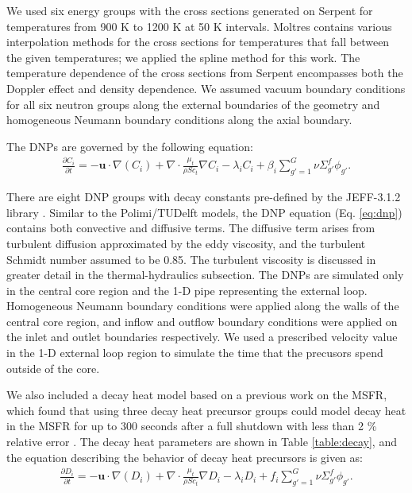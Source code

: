 We used six energy groups with the cross sections generated on Serpent for
temperatures from 900 K to 1200 K at 50 K intervals. Moltres contains various
interpolation methods for the cross sections for temperatures that fall
between the given temperatures; we applied the spline method for this work.
The temperature dependence of the cross sections from Serpent encompasses both
the Doppler effect and density dependence. We assumed vacuum boundary
conditions for all six neutron groups along the external boundaries of the
geometry and homogeneous Neumann boundary conditions along the axial boundary.

The \glspl{DNP} are governed by the following equation:
%
\begin{align}
	\frac{\partial C_i}{\partial t} = - \boldsymbol{u} \cdot \nabla(C_i)
	+ \nabla \cdot \frac{\mu_t}{\rho Sc_t} \nabla C_i	
	- \lambda_i C_i + \beta_i \sum^G_{g'=1} \nu \Sigma^f_{g'}
	\phi_{g'}. \label{eq:dnp}
\end{align}

There are eight \gls{DNP} groups with decay constants pre-defined by the
JEFF-3.1.2 library \cite{oecd/nea_jeff-3.1.2_2014}. Similar to the
Polimi/TUDelft models, the \gls{DNP} equation (Eq. \ref{eq:dnp}) contains both
convective and diffusive terms. The diffusive term arises from turbulent
diffusion approximated by the eddy viscosity, and the turbulent Schmidt
number assumed to be 0.85. The turbulent viscosity is discussed in greater
detail in the thermal-hydraulics subsection. The \glspl{DNP} are simulated
only in the central core region and the 1-D pipe representing the external
loop. Homogeneous Neumann boundary conditions were applied along the walls of
the central core region, and inflow and outflow boundary conditions were
applied on the inlet and outlet boundaries respectively. We used a prescribed
velocity value in the 1-D external loop region to simulate the time that the
precusors spend outside of the core.

We also included a decay heat model based on a previous work
\cite{aufiero_extended_2013} on the \gls{MSFR}, which found that using three
decay heat precursor groups could model decay heat in the \gls{MSFR} for up to
300 seconds after a full shutdown with less than 2 \% relative error
\cite{aufiero_development_2014}. The decay heat parameters are shown in Table
\ref{table:decay}, and the equation describing the behavior of decay heat
precursors is given as:
%
\begin{align}
	\frac{\partial D_i}{\partial t} = - \boldsymbol{u} \cdot \nabla(D_i)
	+ \nabla \cdot \frac{\mu_t}{\rho Sc_t} \nabla D_i	
	- \lambda_i D_i + f_i \sum^G_{g'=1} \nu \Sigma^f_{g'}
	\phi_{g'}. \label{eq:decayheat}
\end{align}

